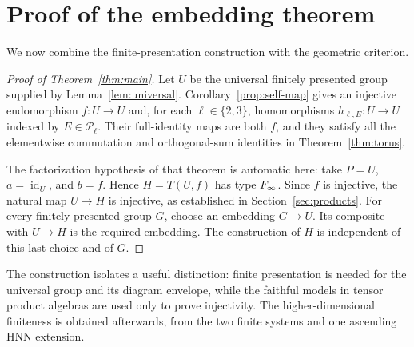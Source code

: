 \section{Proof of the embedding theorem}\label{sec:assembly}

We now combine the finite-presentation construction with the geometric
criterion.

\begin{proof}[Proof of Theorem~\ref{thm:main}]
Let $U$ be the universal finitely presented group supplied by
Lemma~\ref{lem:universal}. Corollary~\ref{prop:self-map} gives an
injective endomorphism $f:U\to U$ and, for each $\ell\in\{2,3\}$,
homomorphisms $h_{\ell,E}:U\to U$ indexed by $E\in\mathcal P_\ell$.
Their full-identity maps are both $f$, and they satisfy all the
elementwise commutation and orthogonal-sum identities in
Theorem~\ref{thm:torus}.

The factorization hypothesis of that theorem is automatic here: take
$P=U$, $a=\operatorname{id}_U$, and $b=f$. Hence
$H=T(U,f)$ has type $F_\infty$. Since $f$ is injective, the natural map
$U\to H$ is injective, as established in Section~\ref{sec:products}.
For every finitely presented group $G$, choose an embedding $G\to U$.
Its composite with $U\to H$ is the required embedding. The construction
of $H$ is independent of this last choice and of $G$.
\end{proof}

The construction isolates a useful distinction: finite presentation is
needed for the universal group and its diagram envelope, while the
faithful models in tensor product algebras are used only to prove injectivity.
The higher-dimensional finiteness is obtained afterwards, from the
two finite systems and one ascending HNN extension.
